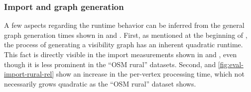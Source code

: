 		\subsubsection{Import and graph generation}
		
			A few aspects regarding the runtime behavior can be inferred from the general graph generation times shown in  and .
			First, as mentioned at the beginning of , the process of generating a visibility graph has an inherent quadratic runtime.
			This fact is directly visible in the import measurements shown in  and , even though it is less prominent in the \enquote{OSM rural} datasets.
			Second,  and \ref{fig:eval-import-rural-rel} show an increase in the per-vertex processing time, which not necessarily grows quadratic as the \enquote{OSM rural} dataset shows.
			
